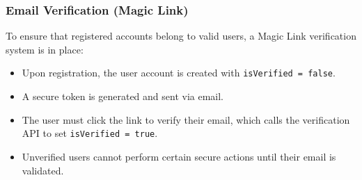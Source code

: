 \subsubsection{Email Verification (Magic Link)}
To ensure that registered accounts belong to valid users, a Magic Link verification system is in place:
\begin{itemize}
    \item Upon registration, the user account is created with \texttt{isVerified = false}.
    \item A secure token is generated and sent via email.
    \item The user must click the link to verify their email, which calls the verification API to set \texttt{isVerified = true}.
    \item Unverified users cannot perform certain secure actions until their email is validated.
\end{itemize}

